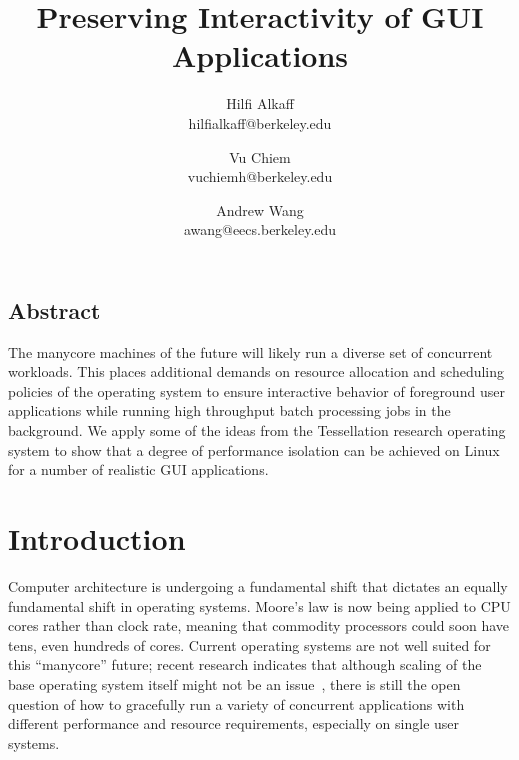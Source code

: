 \documentclass[letterpaper,twocolumn,11pt]{article}
\begin{document}
\date{}

\title{\Large \bf Preserving Interactivity of GUI Applications}

\author{
{\rm Hilfi Alkaff}\\
hilfialkaff@berkeley.edu
\and
{\rm Vu Chiem}\\
vuchiemh@berkeley.edu
\and
{\rm Andrew Wang}\\
awang@eecs.berkeley.edu
} %

\maketitle



\subsection*{Abstract}
The manycore machines of the future will likely run a diverse set of concurrent workloads. This places additional demands on resource allocation and scheduling policies of the operating system to ensure interactive behavior of foreground user applications while running high throughput batch processing jobs in the background. We apply some of the ideas from the Tessellation research operating system to show that a degree of performance isolation can be achieved on Linux for a number of realistic GUI applications.

\section{Introduction}

Computer architecture is undergoing a fundamental shift that dictates an equally fundamental shift in operating systems. Moore's law is now being applied to CPU cores rather than clock rate, meaning that commodity processors could soon have tens, even hundreds of cores. Current operating systems are not well suited for this ``manycore'' future; recent research indicates that although scaling of the base operating system itself might not be an issue~\cite{linux:osdi10}, there is still the open question of how to gracefully run a variety of concurrent applications with different performance and resource requirements, especially on single user systems.
\end{document}
